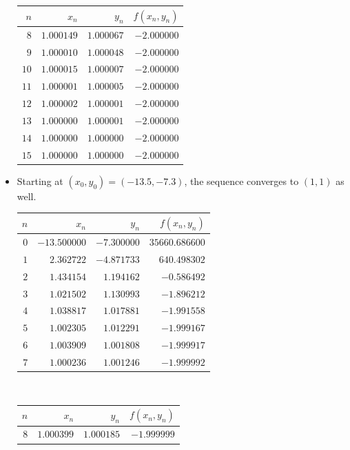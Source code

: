 \begin{example}
\begin{itemize}
\begin{center}
\begin{tabular}{|r|r|r|r|}
	$n$ & $x_n$ & $y_n$ & $f(x_n,y_n)$ \\ \hline \hline 
	$8$ & $1.000149$ & $1.000067$ & $-2.000000$ \\ \hline 
	$9$ & $1.000010$ & $1.000048$ & $-2.000000$ \\ \hline 
	$10$ & $1.000015$ & $1.000007$ & $-2.000000$ \\ \hline 
	$11$ & $1.000001$ & $1.000005$ & $-2.000000$ \\ \hline 
	$12$ & $1.000002$ & $1.000001$ & $-2.000000$ \\ \hline 
	$13$ & $1.000000$ & $1.000001$ & $-2.000000$ \\ \hline 
	$14$ & $1.000000$ & $1.000000$ & $-2.000000$ \\ \hline 
	$15$ & $1.000000$ & $1.000000$ & $-2.000000$ \\ \hline 
	\end{tabular}
	\end{center}
	\item Starting at $(x_0, y_0) = (-13.5, -7.3)$, the sequence converges to $(1,1)$ as well.
	\begin{center}
	\begin{tabular}{|r|r|r|r|} \hline 
	$n$ & $x_n$ & $y_n$ & $f(x_n,y_n)$ \\ \hline \hline 
	$0$ & $-13.500000$ & $-7.300000$ & $35660.686600$ \\ \hline 
	$1$ & $2.362722$ & $-4.871733$ & $640.498302$ \\ \hline 
	$2$ & $1.434154$ & $1.194162$ & $-0.586492$ \\ \hline 
	$3$ & $1.021502$ & $1.130993$ & $-1.896212$ \\ \hline 
	$4$ & $1.038817$ & $1.017881$ & $-1.991558$ \\ \hline 
	$5$ & $1.002305$ & $1.012291$ & $-1.999167$ \\ \hline 
	$6$ & $1.003909$ & $1.001808$ & $-1.999917$ \\ \hline 
	$7$ & $1.000236$ & $1.001246$ & $-1.999992$ \\ \hline 
	\end{tabular}~\begin{tabular}{|r|r|r|r|} \hline 
	$n$ & $x_n$ & $y_n$ & $f(x_n,y_n)$ \\ \hline \hline 
	$8$ & $1.000399$ & $1.000185$ & $-1.999999$ \\ \hline 

\end{tabular}
\end{center}
\end{itemize}
\end{example}
